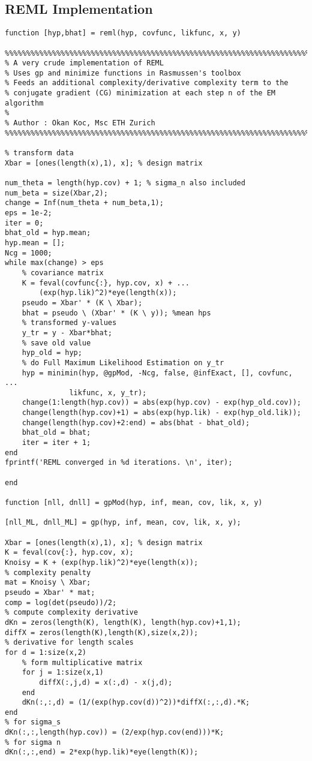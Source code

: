\subsection{REML Implementation}

\begin{verbatim}
function [hyp,bhat] = reml(hyp, covfunc, likfunc, x, y)

%%%%%%%%%%%%%%%%%%%%%%%%%%%%%%%%%%%%%%%%%%%%%%%%%%%%%%%%%%%%%%%%%%%%%%%%%%%
% A very crude implementation of REML 
% Uses gp and minimize functions in Rasmussen's toolbox 
% Feeds an additional complexity/derivative complexity term to the 
% conjugate gradient (CG) minimization at each step n of the EM algorithm
%
% Author : Okan Koc, Msc ETH Zurich
%%%%%%%%%%%%%%%%%%%%%%%%%%%%%%%%%%%%%%%%%%%%%%%%%%%%%%%%%%%%%%%%%%%%%%%%%%%

% transform data
Xbar = [ones(length(x),1), x]; % design matrix

num_theta = length(hyp.cov) + 1; % sigma_n also included
num_beta = size(Xbar,2);
change = Inf(num_theta + num_beta,1);
eps = 1e-2;
iter = 0;
bhat_old = hyp.mean;
hyp.mean = [];
Ncg = 1000;
while max(change) > eps
    % covariance matrix 
    K = feval(covfunc{:}, hyp.cov, x) + ...
        (exp(hyp.lik)^2)*eye(length(x));
    pseudo = Xbar' * (K \ Xbar);
    bhat = pseudo \ (Xbar' * (K \ y)); %mean hps
    % transformed y-values
    y_tr = y - Xbar*bhat;
    % save old value
    hyp_old = hyp;
    % do Full Maximum Likelihood Estimation on y_tr
    hyp = minimin(hyp, @gpMod, -Ncg, false, @infExact, [], covfunc, ...
               likfunc, x, y_tr);
    change(1:length(hyp.cov)) = abs(exp(hyp.cov) - exp(hyp_old.cov));
    change(length(hyp.cov)+1) = abs(exp(hyp.lik) - exp(hyp_old.lik));
    change(length(hyp.cov)+2:end) = abs(bhat - bhat_old);
    bhat_old = bhat;
    iter = iter + 1;
end
fprintf('REML converged in %d iterations. \n', iter);

end

function [nll, dnll] = gpMod(hyp, inf, mean, cov, lik, x, y)

[nll_ML, dnll_ML] = gp(hyp, inf, mean, cov, lik, x, y);

Xbar = [ones(length(x),1), x]; % design matrix
K = feval(cov{:}, hyp.cov, x);
Knoisy = K + (exp(hyp.lik)^2)*eye(length(x));
% complexity penalty
mat = Knoisy \ Xbar;
pseudo = Xbar' * mat;
comp = log(det(pseudo))/2;
% compute complexity derivative
dKn = zeros(length(K), length(K), length(hyp.cov)+1,1); 
diffX = zeros(length(K),length(K),size(x,2));
% derivative for length scales
for d = 1:size(x,2)
    % form multiplicative matrix
    for j = 1:size(x,1)
        diffX(:,j,d) = x(:,d) - x(j,d);
    end
    dKn(:,:,d) = (1/(exp(hyp.cov(d))^2))*diffX(:,:,d).*K;
end
% for sigma_s
dKn(:,:,length(hyp.cov)) = (2/exp(hyp.cov(end)))*K;
% for sigma n
dKn(:,:,end) = 2*exp(hyp.lik)*eye(length(K));


\end{verbatim}
